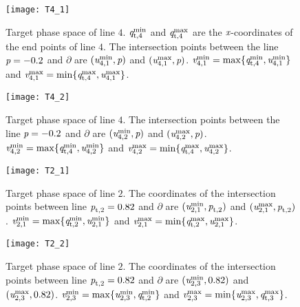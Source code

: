 \begin{figure}
\begin{minipage}[]{.48\textwidth}
\centering
   \texttt{[image: T4\_1]}
  \caption{\footnotesize{Target phase space of line $4$. $\textit{q}_{\textrm{t,} \textit{$4$}}^{\textrm{min}}$ and $\textit{q}_{\textrm{t,} \textit{$4$}}^{\textrm{max}}$ are the $\textit{x}$-coordinates of the end points of line $4$.
  The intersection points between the line $\textit{p} = -0.2$ and $\partial$ are $(\textit{u}_{4,1}^{\textrm{min}}, \textit{p})$ and
  $(\textit{u}_{4,1}^{\textrm{max}}, \textit{p})$. $\textit{v}_{4,1}^{\textrm{min}}= \max \{\textit{q}_{\textrm{t,} \textit{$4$}}^{\textrm{min}}, \textit{u}_{4,1}^{\textrm{min}}\}$ and
  $\textit{v}_{4,1}^{\textrm{max}}= \min \{\textit{q}_{\textrm{t,} \textit{$4$}}^{\textrm{max}}, \textit{u}_{4,1}^{\textrm{max}}\}$.}}
   \label{fig:T41}
\end{minipage}
 \begin{minipage}[]{.48\textwidth}
  \centering
   \texttt{[image: T4\_2]}
   \caption{\footnotesize{Target phase space of line $4$.
  The intersection points between the line $\textit{p} = -0.2$ and $\partial$ are $(\textit{u}_{4,2}^{\textrm{min}}, \textit{p})$ and
  $(\textit{u}_{4,2}^{\textrm{max}}, \textit{p})$. $\textit{v}_{4,2}^{\textrm{min}}= \max \{\textit{q}_{\textrm{t,} \textit{$4$}}^{\textrm{min}}, \textit{u}_{4,2}^{\textrm{min}}\}$ and
  $\textit{v}_{4,2}^{\textrm{max}}= \min \{\textit{q}_{\textrm{t,} \textit{$4$}}^{\textrm{max}}, \textit{u}_{4,2}^{\textrm{max}}\}$.\\}}
   \label{fig:T42}
 \end{minipage}
 \begin{minipage}[]{.48\textwidth}
   \centering
   \texttt{[image: T2\_1]}
   \caption{\footnotesize{Target phase space of line $2$. The coordinates of the intersection points between line $\textit{p}_{\textrm{t,} \textit{$2$}} = 0.82$ and $\partial$ are
  $(\textit{u}_{2,1}^{\textrm{min}}, \textit{p}_{\textrm{t,} \textit{$2$}})$ and $(\textit{u}_{2,1}^{\textrm{max}}, \textit{p}_{\textrm{t,} \textit{$2$}})$.
  $\textit{v}_{2,1}^{\textrm{min}}= \max \{\textit{q}_{\textrm{t,} \textit{$2$}}^{\textrm{min}}, \textit{u}_{2,1}^{\textrm{min}}\}$ and
  $\textit{v}_{2,1}^{\textrm{max}}= \min \{\textit{q}_{\textrm{t,} \textit{$2$}}^{\textrm{max}}, \textit{u}_{2,1}^{\textrm{max}}\}$.}}
    \label{fig:T21}
 \end{minipage}
 \begin{minipage}[]{.48\textwidth}
  \centering
   \texttt{[image: T2\_2]}
\caption{\footnotesize{Target phase space of line $2$.
  The coordinates of the intersection points between line $\textit{p}_{\textrm{t,} \textit{$2$}}=0.82$ and $\partial$ are
  $(\textit{u}_{2,3}^{\textrm{min}}, 0.82)$ and $(\textit{u}_{2,3}^{\textrm{max}}, 0.82)$.
  $\textit{v}_{2,3 }^{\textrm{min}} = \max\{\textit{u}_{2,3}^{\textrm{min}}, \textit{q}_{\textrm{t,} \textit{$2$}}^{\textrm{min}}\}$ and
   $\textit{v}_{2,3 }^{\textrm{max}} = \min\{\textit{u}_{2,3}^{\textrm{max}}, \textit{q}_{\textrm{t,} \textit{$3$}}^{\textrm{max}}\}$.}}
 \label{fig:T22}
 \end{minipage}
\hspace{3cm}
 \end{figure}
